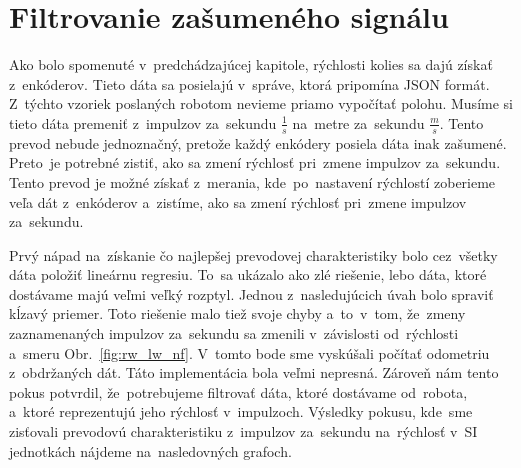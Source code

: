 \section{Filtrovanie zašumeného signálu}
\label{sec:ziskavanieRychlosti}

Ako bolo spomenuté v~predchádzajúcej kapitole, rýchlosti kolies sa dajú získať z~enkóderov. Tieto dáta sa posielajú v~správe, ktorá pripomína JSON formát.
Z~týchto vzoriek poslaných robotom nevieme priamo vypočítať polohu. Musíme si tieto dáta premeniť z~impulzov za~sekundu \(\frac{1}{s}\) na~metre
za~sekundu \(\frac{m}{s}\). Tento prevod nebude jednoznačný, pretože každý enkódery posiela dáta inak zašumené. Preto~je potrebné zistiť, ako sa zmení
rýchlosť pri~zmene impulzov za~sekundu. Tento prevod je možné získať z~merania, kde~po~nastavení rýchlostí zoberieme veľa dát z~enkóderov a~zistíme,
ako sa zmení rýchlosť pri~zmene impulzov za~sekundu.

Prvý nápad na~získanie čo najlepšej prevodovej charakteristiky bolo cez~všetky dáta položiť lineárnu regresiu. To~sa ukázalo ako zlé riešenie, lebo dáta,
ktoré dostávame majú veľmi veľký rozptyl. Jednou z~nasledujúcich úvah bolo spraviť kĺzavý priemer. Toto riešenie malo tiež svoje chyby a~to~v~tom, že~zmeny
zaznamenaných impulzov za~sekundu sa zmenili v~závislosti od~rýchlosti a~smeru Obr.~\ref{fig:rw_lw_nf}. V~tomto bode sme vyskúšali počítať odometriu
z~obdržaných dát. Táto implementácia bola veľmi nepresná. Zároveň nám tento pokus potvrdil, že~potrebujeme filtrovať dáta, ktoré dostávame
od~robota, a~ktoré reprezentujú jeho rýchlosť v~impulzoch. Výsledky pokusu, kde~sme zisťovali prevodovú charakteristiku z~impulzov za~sekundu na~rýchlosť
v~SI jednotkách nájdeme na~nasledovných grafoch.

